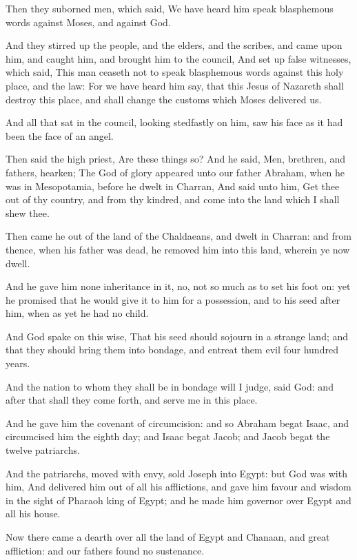 \Verse Then they suborned men, which said, We have heard him speak blasphemous words against Moses, and against God.

\Verse And they stirred up the people, and the elders, and the scribes, and came upon him, and caught him, and brought him to the council, \Verse And set up false witnesses, which said, This man ceaseth not to speak blasphemous words against this holy place, and the law: \Verse For we have heard him say, that this Jesus of Nazareth shall destroy this place, and shall change the customs which Moses delivered us.

\Verse And all that sat in the council, looking stedfastly on him, saw his face as it had been the face of an angel.


\Chapter
\Verse Then said the high priest, Are these things so?  \Verse And he said, Men, brethren, and fathers, hearken; The God of glory appeared unto our father Abraham, when he was in Mesopotamia, before he dwelt in Charran, \Verse And said unto him, Get thee out of thy country, and from thy kindred, and come into the land which I shall shew thee.

\Verse Then came he out of the land of the Chaldaeans, and dwelt in Charran: and from thence, when his father was dead, he removed him into this land, wherein ye now dwell.

\Verse And he gave him none inheritance in it, no, not so much as to set his foot on: yet he promised that he would give it to him for a possession, and to his seed after him, when as yet he had no child.

\Verse And God spake on this wise, That his seed should sojourn in a strange land; and that they should bring them into bondage, and entreat them evil four hundred years.

\Verse And the nation to whom they shall be in bondage will I judge, said God: and after that shall they come forth, and serve me in this place.

\Verse And he gave him the covenant of circumcision: and so Abraham begat Isaac, and circumcised him the eighth day; and Isaac begat Jacob; and Jacob begat the twelve patriarchs.

\Verse And the patriarchs, moved with envy, sold Joseph into Egypt: but God was with him, \Verse And delivered him out of all his afflictions, and gave him favour and wisdom in the sight of Pharaoh king of Egypt; and he made him governor over Egypt and all his house.

\Verse Now there came a dearth over all the land of Egypt and Chanaan, and great affliction: and our fathers found no sustenance.

